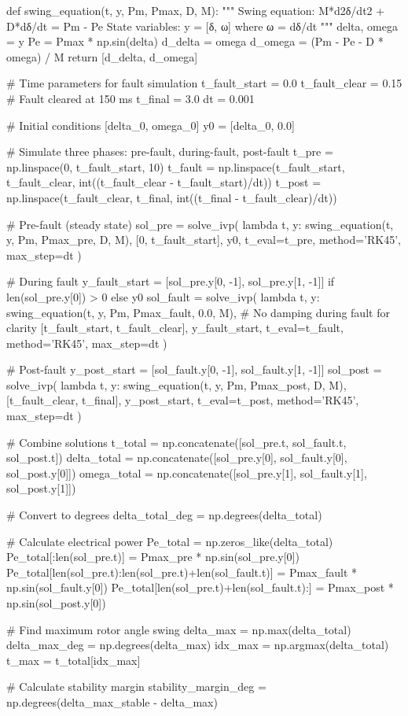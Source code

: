 \documentclass[11pt,a4paper]{article}
\begin{document}
\begin{pycode}
def swing_equation(t, y, Pm, Pmax, D, M):
    """
    Swing equation: M*d2δ/dt2 + D*dδ/dt = Pm - Pe
    State variables: y = [δ, ω] where ω = dδ/dt
    """
    delta, omega = y
    Pe = Pmax * np.sin(delta)
    d_delta = omega
    d_omega = (Pm - Pe - D * omega) / M
    return [d_delta, d_omega]

# Time parameters for fault simulation
t_fault_start = 0.0
t_fault_clear = 0.15  # Fault cleared at 150 ms
t_final = 3.0
dt = 0.001

# Initial conditions [delta_0, omega_0]
y0 = [delta_0, 0.0]

# Simulate three phases: pre-fault, during-fault, post-fault
t_pre = np.linspace(0, t_fault_start, 10)
t_fault = np.linspace(t_fault_start, t_fault_clear, int((t_fault_clear - t_fault_start)/dt))
t_post = np.linspace(t_fault_clear, t_final, int((t_final - t_fault_clear)/dt))

# Pre-fault (steady state)
sol_pre = solve_ivp(
    lambda t, y: swing_equation(t, y, Pm, Pmax_pre, D, M),
    [0, t_fault_start], y0, t_eval=t_pre, method='RK45', max_step=dt
)

# During fault
y_fault_start = [sol_pre.y[0, -1], sol_pre.y[1, -1]] if len(sol_pre.y[0]) > 0 else y0
sol_fault = solve_ivp(
    lambda t, y: swing_equation(t, y, Pm, Pmax_fault, 0.0, M),  # No damping during fault for clarity
    [t_fault_start, t_fault_clear], y_fault_start, t_eval=t_fault, method='RK45', max_step=dt
)

# Post-fault
y_post_start = [sol_fault.y[0, -1], sol_fault.y[1, -1]]
sol_post = solve_ivp(
    lambda t, y: swing_equation(t, y, Pm, Pmax_post, D, M),
    [t_fault_clear, t_final], y_post_start, t_eval=t_post, method='RK45', max_step=dt
)

# Combine solutions
t_total = np.concatenate([sol_pre.t, sol_fault.t, sol_post.t])
delta_total = np.concatenate([sol_pre.y[0], sol_fault.y[0], sol_post.y[0]])
omega_total = np.concatenate([sol_pre.y[1], sol_fault.y[1], sol_post.y[1]])

# Convert to degrees
delta_total_deg = np.degrees(delta_total)

# Calculate electrical power
Pe_total = np.zeros_like(delta_total)
Pe_total[:len(sol_pre.t)] = Pmax_pre * np.sin(sol_pre.y[0])
Pe_total[len(sol_pre.t):len(sol_pre.t)+len(sol_fault.t)] = Pmax_fault * np.sin(sol_fault.y[0])
Pe_total[len(sol_pre.t)+len(sol_fault.t):] = Pmax_post * np.sin(sol_post.y[0])

# Find maximum rotor angle swing
delta_max = np.max(delta_total)
delta_max_deg = np.degrees(delta_max)
idx_max = np.argmax(delta_total)
t_max = t_total[idx_max]

# Calculate stability margin
stability_margin_deg = np.degrees(delta_max_stable - delta_max)
\end{pycode}
\end{document}
